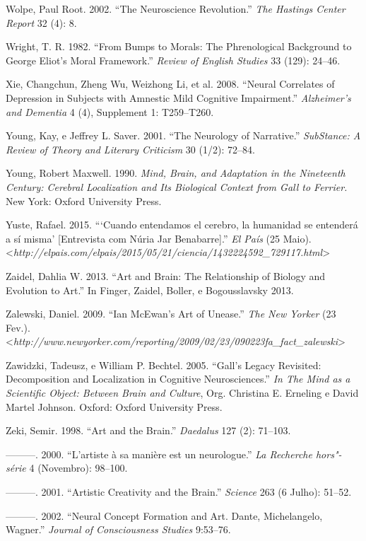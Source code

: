 Wolpe, Paul Root. 2002. ``The Neuroscience Revolution.'' \emph{The
Hastings Center Report} 32 (4): 8.

Wright, T. R. 1982. ``From Bumps to Morals: The Phrenological Background
to George Eliot's Moral Framework.'' \emph{Review of English Studies} 33
(129): 24--46.

Xie, Changchun, Zheng Wu, Weizhong Li, et al. 2008. ``Neural Correlates
of Depression in Subjects with Amnestic Mild Cognitive Impairment.''
\emph{Alzheimer's and Dementia} 4 (4), Supplement 1: T259--T260.

Young, Kay, e Jeffrey L. Saver. 2001. ``The Neurology of Narrative.''
\emph{SubStance: A Review of Theory and Literary Criticism} 30 (1/2):
72--84.

Young, Robert Maxwell. 1990. \emph{Mind, Brain, and Adaptation in the
Nineteenth Century: Cerebral Localization and Its Biological Context
from Gall to Ferrier.} New York: Oxford University Press.

Yuste, Rafael. 2015. ```Cuando entendamos el cerebro, la humanidad se
entenderá a sí misma' {[}Entrevista com Núria Jar Benabarre{]}.''
\emph{El País} (25 Maio).
\textless{}\emph{http://elpais.com/elpais/2015/05/21/ciencia/1432224592\_729117.html}\textgreater{}

Zaidel, Dahlia W. 2013. ``Art and Brain: The Relationship of Biology and
Evolution to Art.'' In Finger, Zaidel, Boller, e Bogousslavsky 2013.

Zalewski, Daniel. 2009. ``Ian McEwan's Art of Unease.'' \emph{The New
Yorker} (23 Fev.).
\textless{}\emph{http://www.newyorker.com/reporting/2009/02/23/090223fa\_fact\_zalewski}\textgreater{}

Zawidzki, Tadeusz, e William P. Bechtel. 2005. ``Gall's Legacy
Revisited: Decomposition and Localization in Cognitive Neurosciences.''
\emph{In The Mind as a Scientific Object: Between Brain and Culture},
Org. Christina E. Erneling e David Martel Johnson. Oxford: Oxford
University Press.

Zeki, Semir. 1998. ``Art and the Brain.'' \emph{Daedalus} 127 (2):
71--103.

---------. 2000. ``L'artiste à sa manière est un neurologue.'' \emph{La
Recherche hors"-série} 4 (Novembro): 98--100.

---------. 2001. ``Artistic Creativity and the Brain.'' \emph{Science}
263 (6 Julho): 51--52.

---------. 2002. ``Neural Concept Formation and Art. Dante,
Michelangelo, Wagner.'' \emph{Journal of Consciousness Studies}
9:53--76.


